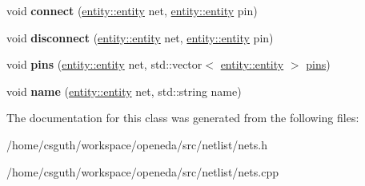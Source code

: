\begin{DoxyCompactItemize}
\item 
\hypertarget{classophidian_1_1netlist_1_1nets_aef35861695fc28ecc4b71a00e24adf97}{void {\bfseries connect} (\hyperlink{classophidian_1_1entity_1_1entity}{entity\-::entity} net, \hyperlink{classophidian_1_1entity_1_1entity}{entity\-::entity} pin)}\label{classophidian_1_1netlist_1_1nets_aef35861695fc28ecc4b71a00e24adf97}

\item 
\hypertarget{classophidian_1_1netlist_1_1nets_a1477fd894470960f368ee16a5029075f}{void {\bfseries disconnect} (\hyperlink{classophidian_1_1entity_1_1entity}{entity\-::entity} net, \hyperlink{classophidian_1_1entity_1_1entity}{entity\-::entity} pin)}\label{classophidian_1_1netlist_1_1nets_a1477fd894470960f368ee16a5029075f}

\item 
\hypertarget{classophidian_1_1netlist_1_1nets_a0a7db9d745a634a1e63373aef9b72630}{void {\bfseries pins} (\hyperlink{classophidian_1_1entity_1_1entity}{entity\-::entity} net, std\-::vector$<$ \hyperlink{classophidian_1_1entity_1_1entity}{entity\-::entity} $>$ \hyperlink{classophidian_1_1netlist_1_1pins}{pins})}\label{classophidian_1_1netlist_1_1nets_a0a7db9d745a634a1e63373aef9b72630}

\item 
\hypertarget{classophidian_1_1netlist_1_1nets_a011db22f9fede13f3bdb91f917c3d775}{void {\bfseries name} (\hyperlink{classophidian_1_1entity_1_1entity}{entity\-::entity} net, std\-::string name)}\label{classophidian_1_1netlist_1_1nets_a011db22f9fede13f3bdb91f917c3d775}

\end{DoxyCompactItemize}


The documentation for this class was generated from the following files\-:\begin{DoxyCompactItemize}
\item 
/home/csguth/workspace/openeda/src/netlist/nets.\-h\item 
/home/csguth/workspace/openeda/src/netlist/nets.\-cpp\end{DoxyCompactItemize}

